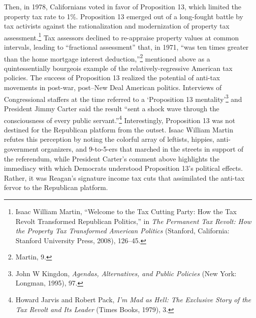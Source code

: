 \documentclass[12pt,oneside]{psthesis}
\begin{document}
Then, in 1978, Californians voted in favor of Proposition 13, which limited the property tax rate to 1\%.
Proposition 13 emerged out of a long-fought battle by tax activists against the rationalization and modernization of property tax assessment.\footnote{Isaac William Martin, ``Welcome to the Tax Cutting Party: How the Tax Revolt Transformed Republican Politics,'' in \emph{The Permanent Tax Revolt: How the Property Tax Transformed American Politics} (Stanford, California: Stanford University Press, 2008), 126--45.}
Tax assessors declined to re-appraise property values at common intervals, leading to ``fractional assessment'' that, in 1971, ``was ten times greater than the home mortgage interest deduction,''\footnote{Martin, 9.} mentioned above as a quintessentially bourgeois example of the relatively-regressive American tax policies.
The success of Proposition 13 realized the potential of anti-tax movements in post-war, post--New Deal American politics.
Interviews of Congressional staffers at the time referred to a `Proposition 13 mentality'\footnote{John W Kingdon, \emph{Agendas, Alternatives, and Public Policies} (New York: Longman, 1995), 97.} and President Jimmy Carter said the result ``sent a shock wave through the consciousness of every public servant.''\footnote{Howard Jarvis and Robert Pack, \emph{I'm Mad as Hell: The Exclusive Story of the Tax Revolt and Its Leader} (Times Books, 1979), 3.}
Interestingly, Proposition 13 was not destined for the Republican platform from the outset.
Isaac William Martin refutes this perception by noting the colorful array of leftists, hippies, anti-government organizers, and 9-to-5-ers that marched in the streets in support of the referendum, while President Carter's comment above highlights the immediacy with which Democrats understood Proposition 13's political effects.
Rather, it was Reagan's signature income tax cuts that assimilated the anti-tax fervor to the Republican platform.
\end{document}
